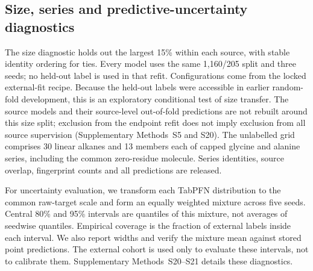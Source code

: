 \subsection*{Size, series and predictive-uncertainty diagnostics}

The size diagnostic holds out the largest 15\% within each source, with stable
identity ordering for ties. Every model uses the same 1,160/205 split and three
seeds; no held-out label is used in that refit. Configurations come from the locked
external-fit recipe. Because the held-out labels were accessible in earlier
random-fold development, this is an exploratory conditional test of size transfer.
The source models and their source-level out-of-fold predictions are not rebuilt
around this size split; exclusion from the endpoint refit does not imply exclusion
from all source supervision (Supplementary Methods~S5 and S20).
The unlabelled grid comprises 30 linear alkanes and 13 members each of capped glycine
and alanine series, including the common zero-residue molecule. Series identities,
source overlap, fingerprint counts and all predictions are released.

For uncertainty evaluation, we transform each TabPFN distribution to the common
raw-target scale and form an equally weighted mixture across five seeds. Central
80\% and 95\% intervals are quantiles of this mixture, not averages of seedwise
quantiles. Empirical coverage is the fraction of external labels inside each
interval. We also report widths and verify the mixture mean against stored point
predictions. The external cohort is used only to evaluate these intervals, not
to calibrate them. Supplementary Methods~S20--S21 details these diagnostics.
